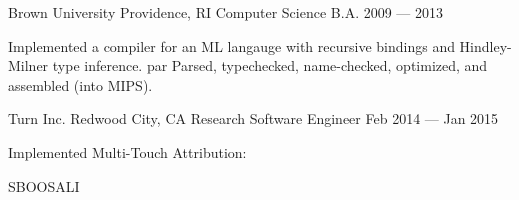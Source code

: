 \documentclass[11pt]{resume}
\begin{document}
\makecvheader[C]



  \begin{cventries}
    \cventry
    {Brown University}
    {Providence, RI}
    {Computer Science B.A.}
    {2009 — 2013}
    {\begin{cvitems}   \item {Implemented a compiler for an ML langauge with recursive bindings and Hindley-Milner type inference. par Parsed, typechecked, name-checked, optimized, and assembled (into MIPS).} \end{cvitems}}
  \end{cventries}



  \begin{cventries}
    \cventry
    {Turn Inc.}
    {Redwood City, CA}
    {Research Software Engineer}
    {Feb 2014 — Jan 2015}
    {
      \begin{cvitems}
        \item {Implemented Multi-Touch Attribution: }
      \end{cvitems}
    }
  \end{cventries}










\makecvfooter
    {SBOOSALI}
    {\thepage}
    {\pageref{LastPage}}
\end{document}
